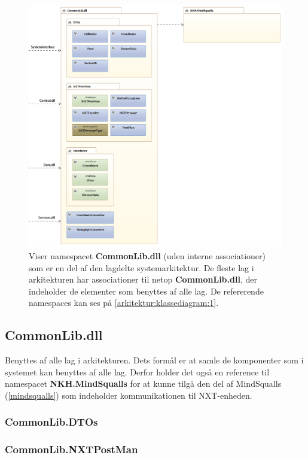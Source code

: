 \begin{figure}
\centering
\includegraphics[width=1\textwidth]{./graphics/systemarkitektur_2}
\caption{Viser namespacet \textbf{CommonLib.dll} (uden interne associationer) som er en del af den lagdelte systemarkitektur. De fleste lag i arkitekturen har associationer til netop \textbf{CommonLib.dll}, der indeholder de elementer som benyttes af alle lag. De refererende namespaces kan ses på \cref{arkitektur:klassediagram:1}.}
\label{arkitektur:klassediagram:2}
\end{figure}

\subsection{CommonLib.dll}\label{arkitektur:commonlib}
Benyttes af alle lag i arkitekturen.
Dets formål er at samle de komponenter som i systemet kan benyttes af alle lag.
Derfor holder det også en reference til namespacet \textbf{NKH.MindSqualls} for at kunne tilgå den del af MindSqualls (\cref{mindsqualls}) som indeholder kommunikationen til NXT-enheden.

\subsubsection{CommonLib.DTOs}


\subsubsection{CommonLib.NXTPostMan}


